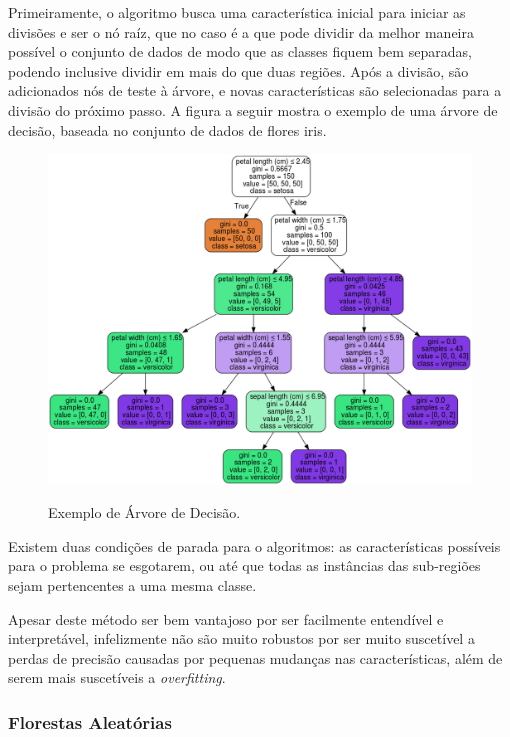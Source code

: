 Primeiramente, o algoritmo busca uma característica inicial para iniciar as divisões e ser o nó raíz, que no caso é a que pode dividir da melhor maneira possível o conjunto de dados de modo que as classes fiquem bem separadas, podendo inclusive dividir em mais do que duas regiões. Após a divisão, são adicionados nós de teste à árvore, e novas características são selecionadas para a divisão do próximo passo. A figura a seguir mostra o exemplo de uma árvore de decisão, baseada no conjunto de dados de flores iris.

\begin{figure}[h]
\caption{\small Exemplo de Árvore de Decisão.}
\centering
\includegraphics[scale=0.40]{figs/arvore-iris.png}
\label{f.arvore-iris}
\end{figure}

Existem duas condições de parada para o algoritmos: as características possíveis para o problema se esgotarem, ou até que todas as instâncias das sub-regiões sejam pertencentes a uma mesma classe. \cite{James:2014:ISL:2517747}

Apesar deste método ser bem vantajoso por ser facilmente entendível e interpretável, infelizmente não são muito robustos por ser muito suscetível a perdas de precisão causadas por pequenas mudanças nas características, além de serem mais suscetíveis a \textit{overfitting}. 

\subsubsection{Florestas Aleatórias}

